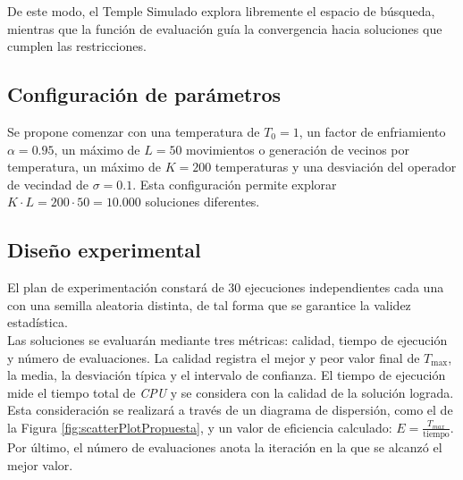De este modo, el Temple Simulado explora libremente el espacio de búsqueda,
mientras que la función de evaluación guía la convergencia hacia soluciones que
cumplen las restricciones.

\subsection*{Configuración de parámetros}
Se propone comenzar con una temperatura de $T_0 = 1$, un factor de enfriamiento
$\alpha = 0.95$, un máximo de $L = 50$ movimientos o generación de vecinos por temperatura,
un máximo de $K = 200$ temperaturas y una desviación del operador de vecindad de $\sigma = 0.1$.
Esta configuración permite explorar $K \cdot L = 200 \cdot 50 = 10.000$ soluciones diferentes.

\subsection*{Diseño experimental}
El plan de experimentación constará de 30 ejecuciones independientes 
cada una con una semilla aleatoria distinta, de tal forma que se garantice la validez 
estadística. \\

Las soluciones se evaluarán mediante tres métricas: calidad, tiempo de ejecución y número de evaluaciones.
La calidad registra el mejor y peor 
valor final de $T_{\max}$, la media, la desviación típica y el intervalo de confianza. El tiempo
de ejecución mide el tiempo total de \textit{CPU} y se considera con la calidad de la
solución lograda. Esta consideración se realizará a través de un diagrama de dispersión, como 
el de la Figura \ref{fig:scatterPlotPropuesta}, y 
un valor de eficiencia calculado: $E = \frac{T_{max}}{\text{tiempo}}$. Por último,
el número de evaluaciones anota la iteración en la que se alcanzó el mejor valor. \\

